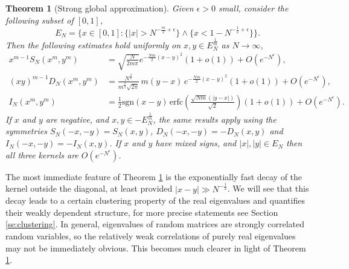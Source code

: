 \documentclass[11pt,reqno]{amsproc}
\newtheorem{theorem}{Theorem}
\numberwithin{equation}{section}
\numberwithin{theorem}{section}
\begin{document}
\begin{theorem}[Strong global approximation]
\label{th:globintro}
Given $\epsilon>0$ small, consider the following subset of $[0,1]$,
\begin{equation}
E_{N} = \{x \in [0,1] : \{|x| > N^{-\frac{m}{2}+\epsilon}\} \wedge \{x < 1-N^{-\frac{1}{2}+\epsilon}\}\}. \label{ENsetintro}
\end{equation}
Then the following estimates hold uniformly on $x,y \in E_{N}^{\frac{1}{m}}$ as $N \to \infty$,
\begin{align}
x^{m-1}S_{N}(x^{m},y^{m}) &= \sqrt{\frac{N}{2m\pi}}e^{-\frac{Nm}{2}(x-y)^{2}}(1+o(1)) + O(e^{-N^{\epsilon}}), \label{Snxyintro} \\
(xy)^{m-1}D_{N}(x^{m},y^{m}) &= \frac{N^{\frac{3}{2}}}{m^{\frac{3}{2}}\sqrt{2\pi}}\,m(y-x)\,e^{-\frac{Nm}{2}(x-y)^{2}}(1+o(1))+O(e^{-N^{\epsilon}}), \label{Dnxyintro}\\
I_{N}(x^{m},y^{m}) &= \frac{1}{2}\mathrm{sgn}(x-y)\,\mathrm{erfc}\left(\frac{\sqrt{Nm}(|y-x|)}{\sqrt{2}}\right)(1+o(1)) + O(e^{-N^{\epsilon}}). \label{Inxyintro}
\end{align}
If $x$ and $y$ are negative, and $x,y \in -E_{N}^{\frac{1}{m}}$, the same results apply using the symmetries $S_{N}(-x,-y) = S_{N}(x,y)$, $D_{N}(-x,-y) = -D_{N}(x,y)$ and $I_{N}(-x,-y) = -I_{N}(x,y)$. If $x$ and $y$ have mixed signs, and $|x|,|y| \in E_{N}$ then all three kernels are $O(e^{-N^{\epsilon}})$.
\end{theorem}
The most immediate feature of Theorem \ref{th:globintro} is the exponentially fast decay of the kernel outside the diagonal, at least provided $|x-y| \gg N^{-\frac{1}{2}}$. We will see that this decay leads to a certain clustering property of the real eigenvalues and quantifies their weakly dependent structure, for more precise statements see Section \ref{se:clustering}. In general, eigenvalues of random matrices are strongly correlated random variables, so the relatively weak correlations of purely real eigenvalues may not be immediately obvious. This becomes much clearer in light of Theorem \ref{th:globintro}.
\end{document}

